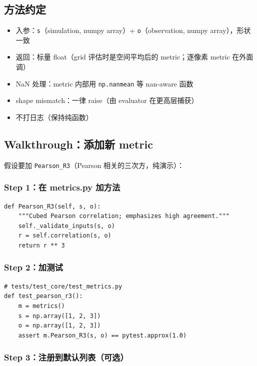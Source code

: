 \subsection{方法约定}

\begin{itemize}
  \item 入参：\texttt{s}（simulation, numpy array）+ \texttt{o}（observation, numpy array），形状一致
  \item 返回：标量 float（grid 评估时是空间平均后的 metric；逐像素 metric 在外面调）
  \item NaN 处理：metric 内部用 \texttt{np.nanmean} 等 nan-aware 函数
  \item shape mismatch：一律 raise（由 evaluator 在更高层捕获）
  \item 不打日志（保持纯函数）
\end{itemize}

\subsection{Walkthrough：添加新 metric}

假设要加 \texttt{Pearson\_R3}（Pearson 相关的三次方，纯演示）：

\subsubsection{Step 1：在 metrics.py 加方法}

\begin{verbatim}
def Pearson_R3(self, s, o):
    """Cubed Pearson correlation; emphasizes high agreement."""
    self._validate_inputs(s, o)
    r = self.correlation(s, o)
    return r ** 3
\end{verbatim}

\subsubsection{Step 2：加测试}

\begin{verbatim}
# tests/test_core/test_metrics.py
def test_pearson_r3():
    m = metrics()
    s = np.array([1, 2, 3])
    o = np.array([1, 2, 3])
    assert m.Pearson_R3(s, o) == pytest.approx(1.0)
\end{verbatim}

\subsubsection{Step 3：注册到默认列表（可选）}

